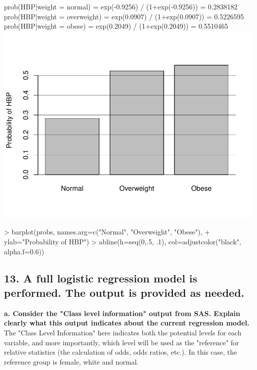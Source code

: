 \documentclass{article}
\begin{document}
\noindent prob(HBP|weight = normal) = exp(-0.9256) / (1+exp(-0.9256)) = 0.2838182\\
\noindent prob(HBP|weight = overweight) = exp(0.0907) / (1+exp(0.0907)) = 0.5226595\\
\noindent prob(HBP|weight = obese) = exp(0.2049) / (1+exp(0.2049)) = 0.5510465\\


\includegraphics{exam2-033}

\begin{Schunk}
\begin{Sinput}
> barplot(probs, names.arg=c("Normal", "Overweight", "Obese"),
+         ylab="Probability of HBP")
> abline(h=seq(0,.5, .1), col=adjustcolor("black", alpha.f=0.6))
\end{Sinput}
\end{Schunk}


\newpage
\subsection*{13. A full logistic regression model is performed.  The output is provided as needed.}

\noindent \textbf{a. Consider the "Class level information" output from SAS. Explain clearly what this output indicates about the current regression model.} \\
The "Class Level Information" here indicates both the potential levels for each variable, and more importantly, which level will be used as the "reference" for relative statistics (the calculation of odds, odds ratios, etc.).  In this case, the reference group is female, white and normal. \\
\end{document}
